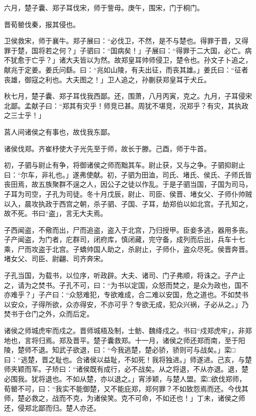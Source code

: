\documentclass[]{article}
\begin{document}
六月，楚子囊、郑子耳伐宋，师于訾毋。庚午，围宋，门于桐门。

晋荀罃伐秦，报其侵也。

卫侯救宋，师于襄牛。郑子展曰：``必伐卫，不然，是不与楚也。得罪于晋，又得罪于楚，国将若之何？」子驷曰：``国病矣！」子展曰：``得罪于二大国，必亡。病不犹愈于亡乎？」诸大夫皆以为然。故郑皇耳帅师侵卫，楚令也。孙文子卜追之，献兆于定姜。姜氏问繇。曰：``兆如山陵，有夫出征，而丧其雄。」姜氏曰：``征者丧雄，御寇之利也。大夫图之！」卫人追之，孙蒯获郑皇耳于犬丘。

秋七月，楚子囊、郑子耳伐我西鄙。还，围萧，八月丙寅，克之。九月，子耳侵宋北鄙。孟献子曰：``郑其有灾乎！师竞已甚。周犹不堪竞，况郑乎？有灾，其执政之三士乎！」

莒人间诸侯之有事也，故伐我东鄙。

诸侯伐郑。齐崔杼使大子光先至于师，故长于滕。己酉，师于牛首。

初，子驷与尉止有争，将御诸侯之师而黜其车。尉止获，又与之争。子驷抑尉止曰：``尔车，非礼也。」遂弗使献。初，子驷为田洫，司氏、堵氏、侯氏、子师氏皆丧田焉，故五族聚群不逞之人，因公子之徒以作乱。于是子驷当国，子国为司马，子耳为司空，子孔为司徒。冬十月戊辰，尉止、司臣、侯晋、堵女父、子师仆帅贼以入，晨攻执政于西宫之朝，杀子驷、子国、子耳，劫郑伯以如北宫。子孔知之，故不死。书曰``盗」，言无大夫焉。

子西闻盗，不儆而出，尸而追盗，盗入于北宫，乃归授甲。臣妾多逃，器用多丧。子产闻盗，为门者，庀群司，闭府库，慎闭藏，完守备，成列而后出，兵车十七乘，尸而攻盗于北宫。子蟜帅国人助之，杀尉止，子师仆，盗众尽死。侯晋奔晋。堵女父、司臣、尉翩、司齐奔宋。

子孔当国，为载书，以位序，听政辟。大夫、诸司、门子弗顺，将诛之。子产止之，请为之焚书。子孔不可，曰：``为书以定国，众怒而焚之，是众为政也，国不亦难乎？」子产曰：``众怒难犯，专欲难成，合二难以安国，危之道也。不如焚书以安众，子得所欲，众亦得安，不亦可乎？专欲无成，犯众兴祸，子必从之。」乃焚书于仓门之外，众而后定。

诸侯之师城虎牢而戍之。晋师城梧及制，士鲂、魏绛戍之。书曰``戍郑虎牢」，非郑地也，言将归焉。郑及晋平。楚子囊救郑。十一月，诸侯之师还郑而南，至于阳陵，楚师不退。知武子欲退，曰：``今我逃楚，楚必骄，骄则可与战矣。」栾□曰：``逃楚，晋之耻也。合诸侯以益耻，不如死！我将独进。」师遂进。己亥，与楚师夹颖而军。子矫曰：``诸侯既有成行，必不战矣。从之将退，不从亦退。退，楚必围我。犹将退也。不如从楚，亦以退之。」宵涉颖，与楚人盟。栾□欲伐郑师，荀罃不可，曰：``我实不能御楚，又不能庇郑，郑何罪？不如致怨焉而还。今伐其师，楚必救之，战而不克，为诸侯笑。克不可命，不如还也！」丁未，诸侯之师还，侵郑北鄙而归。楚人亦还。
\end{document}
